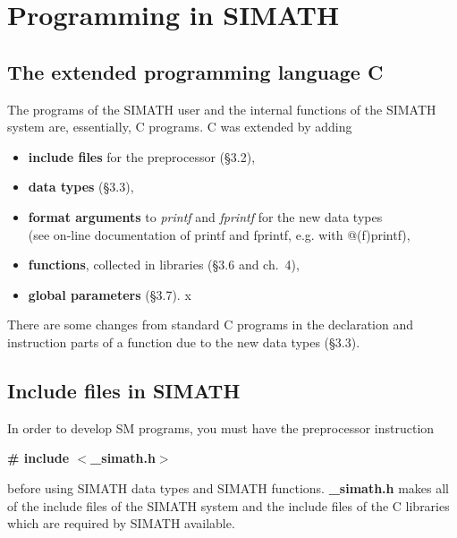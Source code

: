 % 
% 

\chapter{Programming in SIMATH}


\section{The extended programming language C}
The programs of the SIMATH user and the internal functions of the 
SIMATH system are, essentially, C programs. C was
extended by adding
\begin{itemize}
\item {\bf include files} for the preprocessor (\S 3.2),
\item {\bf data types} (\S 3.3),
\item {\bf format arguments} to {\em printf\/} and {\em fprintf\/} for
the new data types\\
(see on-line documentation of printf and fprintf, e.g. with @(f)printf),
\item {\bf functions}, collected in libraries (\S 3.6 and ch.~4),
\item {\bf global parameters} (\S 3.7).
x\end{itemize}
There are some changes from standard C programs in the declaration and instruction
parts of a function due to the new data types (\S 3.3).

 
\section{Include files in SIMATH}
In order to develop SM programs, you must have the preprocessor instruction
\begin{center}
{\bf \# include $<$\_simath.h$>$}
\end{center}
before using SIMATH data types and SIMATH functions. {\bf \_simath.h} makes all of the include files of
the SIMATH system and the include files of the C libraries which are required by SIMATH
available.

